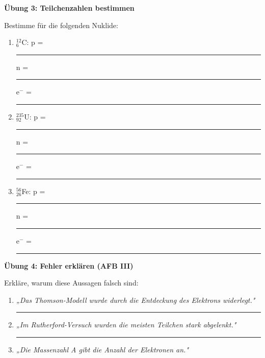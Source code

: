 \documentclass[10pt, a4paper]{article}
\newcommand{\fachfarbe}{physik}
\newcommand{\luecke}[1]{\rule{#1}{0.4pt}}
\newcommand{\abschnitt}[1]{%
    \vspace{8pt}
    \noindent\textbf{\textcolor{\fachfarbe}{#1}}
    \vspace{4pt}
}
\begin{document}
\begin{multicols}{2}
\abschnitt{Übung 3: Teilchenzahlen bestimmen}

Bestimme für die folgenden Nuklide:

\vspace{6pt}

\begin{enumerate}[leftmargin=2em]
\item $^{12}_{6}$C: \quad p = \luecke{0.8cm} \quad n = \luecke{0.8cm} \quad e$^-$ = \luecke{0.8cm}

\vspace{2pt}

\item $^{235}_{92}$U: \quad p = \luecke{0.8cm} \quad n = \luecke{0.8cm} \quad e$^-$ = \luecke{0.8cm}

\vspace{2pt}

\item $^{56}_{26}$Fe: \quad p = \luecke{0.8cm} \quad n = \luecke{0.8cm} \quad e$^-$ = \luecke{0.8cm}
\end{enumerate}

\vspace{8pt}


\abschnitt{Übung 4: Fehler erklären (AFB III)}

\begin{fehlerbox}
Erkläre, warum diese Aussagen falsch sind:

\vspace{6pt}

\begin{enumerate}[leftmargin=1.5em]
\item \textit{„Das Thomson-Modell wurde durch die Entdeckung des Elektrons widerlegt."}

\vspace{4pt}
\luecke{5.5cm}

\vspace{6pt}

\item \textit{„Im Rutherford-Versuch wurden die meisten Teilchen stark abgelenkt."}

\vspace{4pt}
\luecke{5.5cm}

\vspace{6pt}

\item \textit{„Die Massenzahl A gibt die Anzahl der Elektronen an."}


\end{enumerate}
\end{fehlerbox}
\end{multicols}
\end{document}
